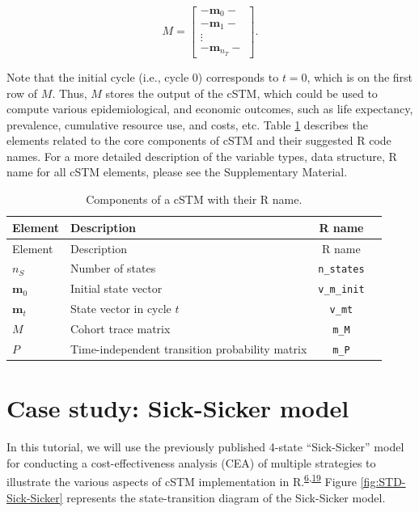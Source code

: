 \documentclass[
]{article}
\begin{document}
\[
  M = 
  \begin{bmatrix}
    - \mathbf{m}_0 -  \\
    - \mathbf{m}_1 -  \\
     \vdots \\
    - \mathbf{m}_{n_T} -  
  \end{bmatrix}. 
\]

Note that the initial cycle (i.e., cycle 0) corresponds to \(t=0\), which is on the first row of \(M\). Thus, \(M\) stores the output of the cSTM, which could be used to compute various epidemiological, and economic outcomes, such as life expectancy, prevalence, cumulative resource use, and costs, etc. Table \ref{tab:cSTM-components-table} describes the elements related to the core components of cSTM and their suggested R code names. For a more detailed description of the variable types, data structure, R name for all cSTM elements, please see the Supplementary Material.

\begin{longtable}[]{@{}llcl@{}}
\caption{\label{tab:cSTM-components-table} Components of a cSTM with their R name.}\tabularnewline
\toprule
Element & Description & R name &\tabularnewline
\midrule
\endfirsthead
\toprule
Element & Description & R name &\tabularnewline
\midrule
\endhead
\(n_S\) & Number of states & \texttt{n\_states} &\tabularnewline
\(\mathbf{m}_0\) & Initial state vector & \texttt{v\_m\_init} &\tabularnewline
\(\mathbf{m}_t\) & State vector in cycle \(t\) & \texttt{v\_mt} &\tabularnewline
\(M\) & Cohort trace matrix & \texttt{m\_M} &\tabularnewline
\(P\) & Time-independent transition probability matrix & \texttt{m\_P} &\tabularnewline
\bottomrule
\end{longtable}

\hypertarget{case-study-sick-sicker-model}{%
\section{Case study: Sick-Sicker model}\label{case-study-sick-sicker-model}}

In this tutorial, we will use the previously published 4-state ``Sick-Sicker'' model for conducting a cost-effectiveness analysis (CEA) of multiple strategies to illustrate the various aspects of cSTM implementation in R.\textsuperscript{\protect\hyperlink{ref-Krijkamp2018}{6},\protect\hyperlink{ref-Enns2015e}{19}} Figure \ref{fig:STD-Sick-Sicker} represents the state-transition diagram of the Sick-Sicker model.
\end{document}
